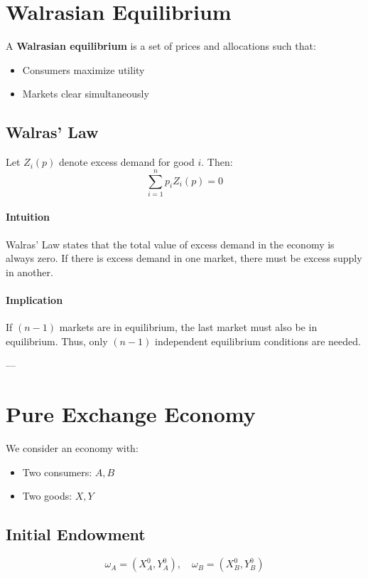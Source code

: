 \section{Walrasian Equilibrium}

A \textbf{Walrasian equilibrium} is a set of prices and allocations such that:
\begin{itemize}
    \item Consumers maximize utility
    \item Markets clear simultaneously
\end{itemize}

\subsection{Walras' Law}

Let $Z_i(p)$ denote excess demand for good $i$. Then:
\[
\sum_{i=1}^{n} p_i Z_i(p) = 0
\]

\paragraph{Intuition}
Walras' Law states that the total value of excess demand in the economy is always zero.  
If there is excess demand in one market, there must be excess supply in another.

\paragraph{Implication}
If $(n-1)$ markets are in equilibrium, the last market must also be in equilibrium.
Thus, only $(n-1)$ independent equilibrium conditions are needed.

---

\section{Pure Exchange Economy}

We consider an economy with:
\begin{itemize}
    \item Two consumers: $A, B$
    \item Two goods: $X, Y$
\end{itemize}

\subsection{Initial Endowment}

\[
\omega_A = (X_A^0, Y_A^0), \quad
\omega_B = (X_B^0, Y_B^0)
\]


